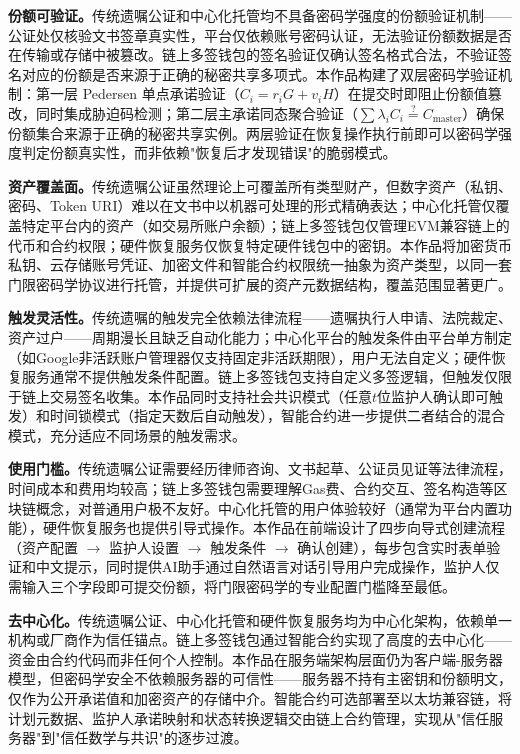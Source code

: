 \documentclass[UTF8,a4paper,zihao=-4,openany]{ctexrep}
\begin{document}
\textbf{份额可验证。}传统遗嘱公证和中心化托管均不具备密码学强度的份额验证机制——公证处仅核验文书签章真实性，平台仅依赖账号密码认证，无法验证份额数据是否在传输或存储中被篡改。链上多签钱包的签名验证仅确认签名格式合法，不验证签名对应的份额是否来源于正确的秘密共享多项式。本作品构建了双层密码学验证机制：第一层 Pedersen 单点承诺验证（$C_i = r_iG + v_iH$）在提交时即阻止份额值篡改，同时集成胁迫码检测；第二层主承诺同态聚合验证（$\sum \lambda_i C_i \stackrel{?}{=} C_{\text{master}}$）确保份额集合来源于正确的秘密共享实例。两层验证在恢复操作执行前即可以密码学强度判定份额真实性，而非依赖"恢复后才发现错误"的脆弱模式。

\textbf{资产覆盖面。}传统遗嘱公证虽然理论上可覆盖所有类型财产，但数字资产（私钥、密码、Token URI）难以在文书中以机器可处理的形式精确表达；中心化托管仅覆盖特定平台内的资产（如交易所账户余额）；链上多签钱包仅管理EVM兼容链上的代币和合约权限；硬件恢复服务仅恢复特定硬件钱包中的密钥。本作品将加密货币私钥、云存储账号凭证、加密文件和智能合约权限统一抽象为资产类型，以同一套门限密码学协议进行托管，并提供可扩展的资产元数据结构，覆盖范围显著更广。

\textbf{触发灵活性。}传统遗嘱的触发完全依赖法律流程——遗嘱执行人申请、法院裁定、资产过户——周期漫长且缺乏自动化能力；中心化平台的触发条件由平台单方制定（如Google非活跃账户管理器仅支持固定非活跃期限），用户无法自定义；硬件恢复服务通常不提供触发条件配置。链上多签钱包支持自定义多签逻辑，但触发仅限于链上交易签名收集。本作品同时支持社会共识模式（任意$t$位监护人确认即可触发）和时间锁模式（指定天数后自动触发），智能合约进一步提供二者结合的混合模式，充分适应不同场景的触发需求。

\textbf{使用门槛。}传统遗嘱公证需要经历律师咨询、文书起草、公证员见证等法律流程，时间成本和费用均较高；链上多签钱包需要理解Gas费、合约交互、签名构造等区块链概念，对普通用户极不友好。中心化托管的用户体验较好（通常为平台内置功能），硬件恢复服务也提供引导式操作。本作品在前端设计了四步向导式创建流程（资产配置 $\to$ 监护人设置 $\to$ 触发条件 $\to$ 确认创建），每步包含实时表单验证和中文提示，同时提供AI助手通过自然语言对话引导用户完成操作，监护人仅需输入三个字段即可提交份额，将门限密码学的专业配置门槛降至最低。

\textbf{去中心化。}传统遗嘱公证、中心化托管和硬件恢复服务均为中心化架构，依赖单一机构或厂商作为信任锚点。链上多签钱包通过智能合约实现了高度的去中心化——资金由合约代码而非任何个人控制。本作品在服务端架构层面仍为客户端-服务器模型，但密码学安全不依赖服务器的可信性——服务器不持有主密钥和份额明文，仅作为公开承诺值和加密资产的存储中介。智能合约可选部署至以太坊兼容链，将计划元数据、监护人承诺映射和状态转换逻辑交由链上合约管理，实现从"信任服务器"到"信任数学与共识"的逐步过渡。
\end{document}
